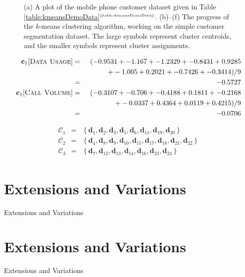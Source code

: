 \documentclass[xcolor={table}]{beamer}
\newcommand{\SectionSlide}[2][]{
	\ifthenelse{\isempty{#1}}
		{\section{#2}\begin{frame} \begin{center}\begin{huge}#2\end{huge}\end{center}\end{frame}}
		{\section[#1]{#2}\begin{frame} \begin{center}\begin{huge}#2\end{huge}\end{center}\end{frame}}
}
\newcommand{\featN}[1]{\textsc{#1}}
\newcommand{\ourRef}[1]{\ref{#1}$^{\text{\tiny[\pageref{#1}]}}$}
\begin{document}
\begin{frame}
\begin{figure}[!t]
{\begin{tabular}{ccc}
\end{tabular}
}	
\caption{(a) A plot of the mobile phone customer dataset given in Table \ourRef{table:kmeansDemoData}. (b)--(f) The progress of the \textit{k}-means clustering algorithm, working on the simple customer segmentation dataset. The large symbols represent cluster centroids, and the smaller symbols represent cluster assignments.}
\label{fig:kmeansDemoDataProcess}
\end{figure}
\end{frame} 



 \begin{frame} 
 \begin{scriptsize}
\begin{eqnarray*}
{\mathbf{c}_1}[\featN{Data Usage}] & = & (-0.9531 + -1.167 + -1.2329 + -0.8431 + 0.9285 \\
~ & ~ & ~~~~~~~~~ + -1.005 + 0.2021 + -0.7426 + -0.3414 )/9 \\
~ & = & -0.5727 \\
{\mathbf{c}_1}[\featN{Call Volume}] & = & (-0.3107 + -0.706 + -0.4188 + 0.1811  + -0.2168  \\
~ & ~ & ~~~~~~~~~ + -0.0337  + 0.4364  + 0.0119  + 0.4215 )/9 \\
~ & = & -0.0706 \\
\end{eqnarray*}
 \end{scriptsize}
\end{frame} 



 \begin{frame} 
\begin{eqnarray*}
\mathcal{C}_1 & = & \left\{\mathbf{d}_{1}, \mathbf{d}_{2}, \mathbf{d}_{3}, \mathbf{d}_{5}, \mathbf{d}_{6}, \mathbf{d}_{11}, \mathbf{d}_{19}, \mathbf{d}_{20}\right\} \\ 
\mathcal{C}_2 & = & \left\{\mathbf{d}_{4}, \mathbf{d}_{8}, \mathbf{d}_{9}, \mathbf{d}_{10}, \mathbf{d}_{15}, \mathbf{d}_{17}, \mathbf{d}_{18}, \mathbf{d}_{21}, \mathbf{d}_{22}\right\} \\ 
\mathcal{C}_3 & = & \left\{\mathbf{d}_{7}, \mathbf{d}_{12}, \mathbf{d}_{13}, \mathbf{d}_{14}, \mathbf{d}_{16}, \mathbf{d}_{23}, \mathbf{d}_{24}\right\} \\ 
\end{eqnarray*}
\end{frame} 


\SectionSlide{Extensions and Variations}
\end{document}
